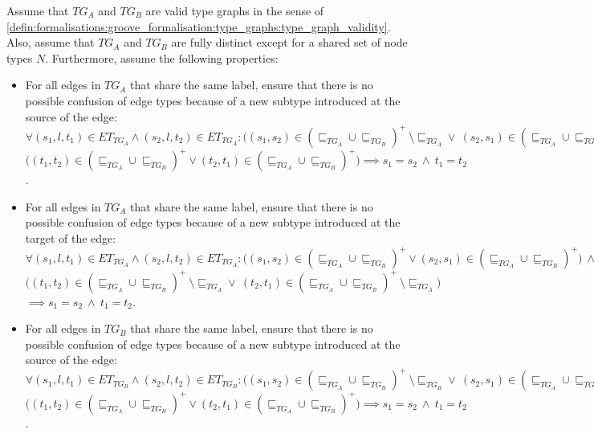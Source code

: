 \begin{lem}
\label{defin:transformation_framework:type_models_and_type_graphs:combining_type_graphs:tg_combine_merge_correct}
Assume that $TG_A$ and $TG_B$ are valid type graphs in the sense of \cref{defin:formalisations:groove_formalisation:type_graphs:type_graph_validity}. Also, assume that $TG_A$ and $TG_B$ are fully distinct except for a shared set of node types $N$. Furthermore, assume the following properties:
\begin{itemize}
    \item For all edges in $TG_A$ that share the same label, ensure that there is no possible confusion of edge types because of a new subtype introduced at the source of the edge: $\forall (s_1, l, t_1) \in ET_{TG_A} \land (s_2, l, t_2) \in ET_{TG_A}\!: \big((s_1, s_2) \in (\sqsubseteq_{TG_A} \cup \sqsubseteq_{TG_B})^+\ \setminus \sqsubseteq_{TG_{A}}\!\! \lor\ (s_2, s_1) \in (\sqsubseteq_{TG_A} \cup \sqsubseteq_{TG_B}\!)^+\ \setminus \sqsubseteq_{TG_{A}}\!\!\big)\ \land$\\$\big((t_1, t_2) \in (\sqsubseteq_{TG_A} \cup \sqsubseteq_{TG_B})^+ \lor (t_2, t_1) \in (\sqsubseteq_{TG_A} \cup \sqsubseteq_{TG_B})^+\big) \implies s_1 = s_2\ \land\ t_1 = t_2$.
    \item For all edges in $TG_A$ that share the same label, ensure that there is no possible confusion of edge types because of a new subtype introduced at the target of the edge: $\forall (s_1, l, t_1) \in ET_{TG_A} \land (s_2, l, t_2) \in ET_{TG_A}\!: \big((s_1, s_2) \in (\sqsubseteq_{TG_A} \cup \sqsubseteq_{TG_B})^+ \lor (s_2, s_1) \in (\sqsubseteq_{TG_A} \cup \sqsubseteq_{TG_B})^+\big)\ \land$\\$\big((t_1, t_2) \in (\sqsubseteq_{TG_A} \cup \sqsubseteq_{TG_B})^+\ \setminus \sqsubseteq_{TG_{A}}\!\! \lor\ (t_2, t_1) \in (\sqsubseteq_{TG_A} \cup \sqsubseteq_{TG_B})^+\ \setminus \sqsubseteq_{TG_{A}}\!\!\big)$\\$\implies s_1 = s_2\ \land\ t_1 = t_2$.
    \item For all edges in $TG_B$ that share the same label, ensure that there is no possible confusion of edge types because of a new subtype introduced at the source of the edge: $\forall (s_1, l, t_1) \in ET_{TG_B} \land (s_2, l, t_2) \in ET_{TG_B}\!: \big((s_1, s_2) \in (\sqsubseteq_{TG_A} \cup \sqsubseteq_{TG_B})^+\ \setminus \sqsubseteq_{TG_{B}}\!\! \lor\ (s_2, s_1) \in (\sqsubseteq_{TG_A} \cup \sqsubseteq_{TG_B})^+\ \setminus \sqsubseteq_{TG_{B}}\!\!\big)\ \land$\\$\big((t_1, t_2) \in (\sqsubseteq_{TG_A} \cup \sqsubseteq_{TG_B})^+ \lor (t_2, t_1) \in (\sqsubseteq_{TG_A} \cup \sqsubseteq_{TG_B})^+\big) \implies s_1 = s_2\ \land\ t_1 = t_2$.

\end{itemize}
\end{lem}
